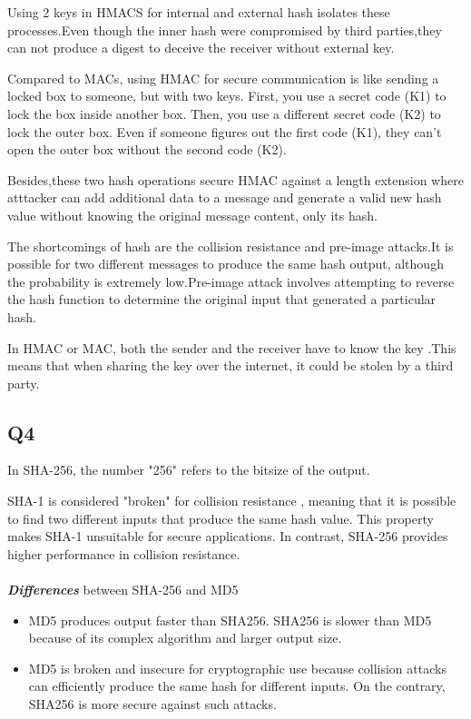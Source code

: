 \documentclass{article}
\begin{document}
	Using 2 keys in HMACS for internal and external hash isolates these processes.Even though the inner hash were compromised by third parties,they can not produce a digest to deceive the receiver without external key.

	Compared to MACs, using HMAC for secure communication is like sending a locked box to someone, but with two keys. First, you use a secret code (K1) to lock the box inside another box. Then, you use a different secret code (K2) to lock the outer box. Even if someone figures out the first code (K1), they can't open the outer box without the second code (K2).

	Besides,these two hash operations secure HMAC against a length extension where atttacker can add additional data to a message and generate a valid new hash value without knowing the original message content, only its hash\cite{Length_extension_attack}.

	The shortcomings of hash are the collision resistance and pre-image attacks\cite{2-1-1.Hash(1)}.It is possible for two different messages to produce the same hash output, although the probability is extremely low.Pre-image attack involves attempting to reverse the hash function to determine the original input that generated a particular hash.

	In HMAC or MAC, both the sender and the receiver have to know the key .This means that when sharing the key over the internet, it could be stolen by a third party.


\subsection{Q4}

In SHA-256, the number "256" refers to the bitsize of the output\cite{SSLDragonSHA256}.

SHA-1 is considered "broken" for collision resistance \cite{2-1-1.Hash(1)}, meaning that it is possible to find two different inputs that produce the same hash value. This property makes SHA-1 unsuitable for secure applications. In contrast, SHA-256 provides higher performance in collision resistance.\\\\


\textbf{\textit{Differences}} between SHA-256 and MD5
\begin{itemize}
	\item MD5 produces output faster than SHA256. SHA256 is slower than MD5 because of its complex algorithm and larger output size\cite{9573660}.

	\item MD5 is broken and insecure for cryptographic use because collision attacks can efficiently produce the same hash for different inputs\cite{2-1-1.Hash(1)}. On the contrary, SHA256 is more secure against such attacks.
\end{itemize}
\end{document}
